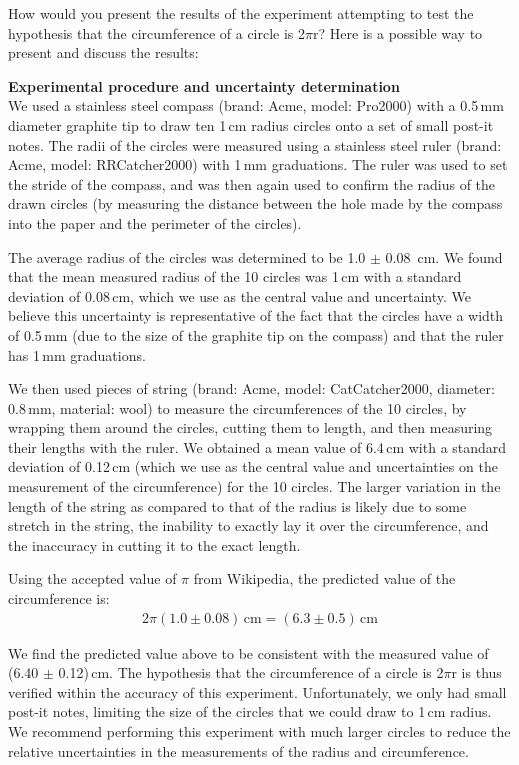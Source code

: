 \begin{example}{How would you present the results of the experiment attempting to test the hypothesis that the circumference of a circle is 2$\pi$r?}{}
\label{ex:chapIntro_2pir}
Here is a possible way to present and discuss the results:

{\bf Experimental procedure and uncertainty determination}\\
We used a stainless steel compass (brand: Acme, model: Pro2000) with a 0.5\,mm diameter graphite tip to draw ten 1\,cm radius circles onto a set of small post-it notes. The radii of the circles were measured using a stainless steel ruler (brand: Acme, model: RRCatcher2000) with 1\,mm graduations. The ruler was used to set the stride of the compass, and was then again used to confirm the radius of the drawn circles (by measuring the distance between the hole made by the compass into the paper and the perimeter of the circles).

The average radius of the circles was determined to be 1.0 $\pm$ 0.08 \,cm. We found that the mean measured radius of the 10 circles was 1\,cm with a standard deviation of 0.08\,cm, which we use as the central value and uncertainty. We believe this uncertainty is representative of the fact that the circles have a width of 0.5\,mm (due to the size of the graphite tip on the compass) and that the ruler has 1\,mm graduations.  

We then used pieces of string (brand: Acme, model: CatCatcher2000, diameter: 0.8\,mm, material: wool) to measure the circumferences of the 10 circles, by wrapping them around the circles, cutting them to length, and then measuring their lengths with the ruler. We obtained a mean value of 6.4\,cm with a standard deviation of 0.12\,cm (which we use as the central value and uncertainties on the measurement of the circumference) for the 10 circles. The larger variation in the length of the string as compared to that of the radius is likely due to some stretch in the string, the inability to exactly lay it over the circumference, and the inaccuracy in cutting it to the exact length.

Using the accepted value of $\pi$ from Wikipedia, the predicted value of the circumference is:
\begin{align*}
2\pi(1.0\pm 0.08)\,\text{cm}=(6.3\pm 0.5)\,\text{cm}
\end{align*}

We find the predicted value above to be consistent with the measured value of (6.40 $\pm$ 0.12)\,cm. The hypothesis that the circumference of a circle is 2$\pi$r is thus verified within the accuracy of this experiment. Unfortunately, we only had small post-it notes, limiting the size of the circles that we could draw to 1\,cm radius. We recommend performing this experiment with much larger circles to reduce the relative uncertainties in the measurements of the radius and circumference.


\end{example}
